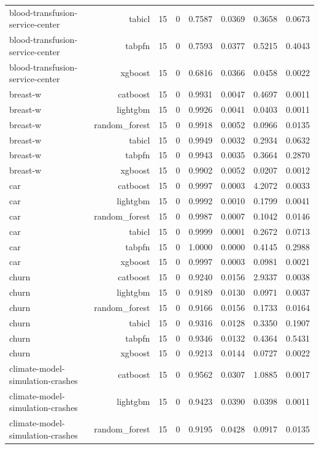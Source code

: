 \begin{table}[htbp]
\begin{tabular}{lrrrrrrr}
blood-transfusion-service-center & tabicl & 15 & 0 & 0.7587 & 0.0369 & 0.3658 & 0.0673 \\
blood-transfusion-service-center & tabpfn & 15 & 0 & 0.7593 & 0.0377 & 0.5215 & 0.4043 \\
blood-transfusion-service-center & xgboost & 15 & 0 & 0.6816 & 0.0366 & 0.0458 & 0.0022 \\
breast-w & catboost & 15 & 0 & 0.9931 & 0.0047 & 0.4697 & 0.0011 \\
breast-w & lightgbm & 15 & 0 & 0.9926 & 0.0041 & 0.0403 & 0.0011 \\
breast-w & random\_forest & 15 & 0 & 0.9918 & 0.0052 & 0.0966 & 0.0135 \\
breast-w & tabicl & 15 & 0 & 0.9949 & 0.0032 & 0.2934 & 0.0632 \\
breast-w & tabpfn & 15 & 0 & 0.9943 & 0.0035 & 0.3664 & 0.2870 \\
breast-w & xgboost & 15 & 0 & 0.9902 & 0.0052 & 0.0207 & 0.0012 \\
car & catboost & 15 & 0 & 0.9997 & 0.0003 & 4.2072 & 0.0033 \\
car & lightgbm & 15 & 0 & 0.9992 & 0.0010 & 0.1799 & 0.0041 \\
car & random\_forest & 15 & 0 & 0.9987 & 0.0007 & 0.1042 & 0.0146 \\
car & tabicl & 15 & 0 & 0.9999 & 0.0001 & 0.2672 & 0.0713 \\
car & tabpfn & 15 & 0 & 1.0000 & 0.0000 & 0.4145 & 0.2988 \\
car & xgboost & 15 & 0 & 0.9997 & 0.0003 & 0.0981 & 0.0021 \\
churn & catboost & 15 & 0 & 0.9240 & 0.0156 & 2.9337 & 0.0038 \\
churn & lightgbm & 15 & 0 & 0.9189 & 0.0130 & 0.0971 & 0.0037 \\
churn & random\_forest & 15 & 0 & 0.9166 & 0.0156 & 0.1733 & 0.0164 \\
churn & tabicl & 15 & 0 & 0.9316 & 0.0128 & 0.3350 & 0.1907 \\
churn & tabpfn & 15 & 0 & 0.9346 & 0.0132 & 0.4364 & 0.5431 \\
churn & xgboost & 15 & 0 & 0.9213 & 0.0144 & 0.0727 & 0.0022 \\
climate-model-simulation-crashes & catboost & 15 & 0 & 0.9562 & 0.0307 & 1.0885 & 0.0017 \\
climate-model-simulation-crashes & lightgbm & 15 & 0 & 0.9423 & 0.0390 & 0.0398 & 0.0011 \\
climate-model-simulation-crashes & random\_forest & 15 & 0 & 0.9195 & 0.0428 & 0.0917 & 0.0135 \\

\end{tabular}
\end{table}
